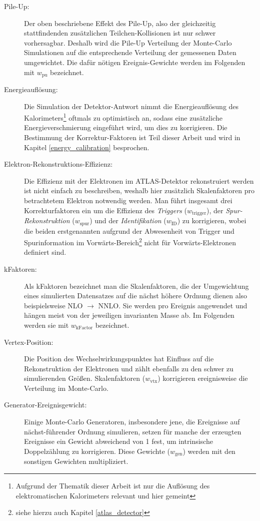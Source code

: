 \begin{description}
    \item[Pile-Up:] Der oben beschriebene Effekt des Pile-Up, also der
        gleichzeitig stattfindenden zusätzlichen Teilchen-Kollisionen ist nur
        schwer vorhersagbar. Deshalb wird die Pile-Up Verteilung der
        Monte-Carlo Simulationen auf die entsprechende Verteilung der
        gemessenen Daten umgewichtet. Die dafür nötigen Ereignis-Gewichte
        werden im Folgenden mit $w_\text{pu}$ bezeichnet.
    \item[Energieauflösung:] Die Simulation der Detektor-Antwort nimmt die
        Energieauflösung des Kalorimeters\footnote{Aufgrund der Thematik dieser
        Arbeit ist nur die Auflösung des elektromatischen Kalorimeters relevant
        und hier gemeint} oftmals zu optimistisch an, sodass eine zusätzliche
        Energieverschmierung eingeführt wird, um dies zu korrigieren. Die
        Bestimmung der Korrektur-Faktoren ist Teil dieser Arbeit und wird in
        Kapitel \ref{energy_calibration} besprochen.
    \item[Elektron-Rekonstruktions-Effizienz:] Die Effizienz mit der Elektronen
        im ATLAS-Detektor rekonstruiert werden ist nicht einfach zu
        beschreiben, weshalb hier zusätzlich Skalenfaktoren pro betrachtetem
        Elektron notwendig werden. Man führt insgesamt drei Korrekturfaktoren
        ein um die Effizienz des \textit{Triggers} ($w_\text{trigger}$), der 
        \textit{Spur-Rekonstruktion} ($w_\text{spur}$) und der
        \textit{Identifikation} ($w_\text{ID}$) zu korrigieren, wobei die
        beiden erstgenannten aufgrund der Abwesenheit von Trigger und
        Spurinformation im Vorwärts-Bereich\footnote{siehe hierzu auch Kapitel
        \ref{atlas_detector}} nicht für Vorwärts-Elektronen definiert sind.
    \item[kFaktoren:] Als kFaktoren bezeichnet man die Skalenfaktoren, die der
        Umgewichtung eines simulierten Datensatzes auf die nächst höhere
        Ordnung dienen also beispielsweise NLO $\rightarrow$ NNLO. Sie werden
        pro Ereignis angewendet und hängen meist von der jeweiligen
        invarianten Masse ab. Im Folgenden werden sie mit $w_\text{kFactor}$
        bezeichnet.
    \item[Vertex-Position:] Die Position des Wechselwirkungspunktes hat
        Einfluss auf die Rekonstruktion der Elektronen und zählt ebenfalls zu
        den schwer zu simulierenden Größen. Skalenfaktoren ($w_\text{vtx}$)
        korrigieren ereignisweise die Verteilung im Monte-Carlo.
    \item[Generator-Ereignisgewicht:] Einige Monte-Carlo Generatoren,
        insbesondere jene, die Ereignisse auf nächst-führender Ordnung
        simulieren, setzen für manche der erzeugten Ereignisse ein Gewicht
        abweichend von 1 fest, um intrinsische Doppelzählung zu korrigieren.
        Diese Gewichte ($w_\text{gen}$) werden mit den sonstigen Gewichten
        multipliziert.
\end{description}

